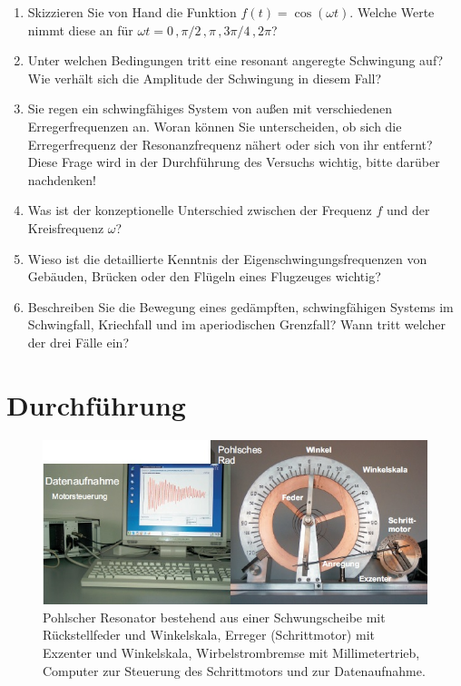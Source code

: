 \begin{enumerate} 
	\item Skizzieren Sie von Hand die Funktion $f(t) = \cos(\omega t)$. Welche Werte nimmt diese an für $\omega t = 0\, , \pi/2\, , \pi\, , 3\pi/4\, , 2\pi$?
	\item Unter welchen Bedingungen tritt eine resonant angeregte Schwingung auf? Wie verhält sich die Amplitude der Schwingung in diesem Fall?
	\item Sie regen ein schwingfähiges System von außen mit verschiedenen Erregerfrequenzen an. Woran können Sie unterscheiden, ob sich die Erregerfrequenz der Resonanzfrequenz nähert oder sich von ihr entfernt? Diese Frage wird in der Durchführung des Versuchs wichtig, bitte darüber nachdenken!
	\item Was ist der konzeptionelle Unterschied zwischen der Frequenz $f$ und der Kreisfrequenz $\omega$?
	\item Wieso ist die detaillierte Kenntnis der Eigenschwingungsfrequenzen von Gebäuden, Brücken oder den Flügeln eines Flugzeuges wichtig?
	\item Beschreiben Sie die Bewegung eines gedämpften, schwingfähigen Systems im Schwingfall, Kriechfall und im aperiodischen Grenzfall? Wann tritt welcher der drei Fälle ein?
\end{enumerate} 

\section{Durchführung} 

\begin{figure}[t]
	\centering
		\includegraphics[width=\textwidth]{Versuch_neu_1-2/figures/Pohl_AP.jpg}
	\caption{Pohlscher Resonator bestehend aus einer Schwungscheibe mit Rückstellfeder und Winkelskala, Erreger (Schrittmotor) mit Exzenter und Winkelskala, Wirbelstrombremse mit Millimetertrieb, Computer zur Steuerung des Schrittmotors und zur Datenaufnahme.}
	\label{fig:Pohl_AP}
\end{figure}


